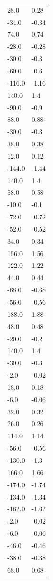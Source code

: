 \begin{longtable}{ll}
28.0 & 0.28 \\
-34.0 & -0.34 \\
74.0 & 0.74 \\
-28.0 & -0.28 \\
-30.0 & -0.3 \\
-60.0 & -0.6 \\
-116.0 & -1.16 \\
140.0 & 1.4 \\
-90.0 & -0.9 \\
88.0 & 0.88 \\
-30.0 & -0.3 \\
38.0 & 0.38 \\
12.0 & 0.12 \\
-144.0 & -1.44 \\
140.0 & 1.4 \\
58.0 & 0.58 \\
-10.0 & -0.1 \\
-72.0 & -0.72 \\
-52.0 & -0.52 \\
34.0 & 0.34 \\
156.0 & 1.56 \\
122.0 & 1.22 \\
44.0 & 0.44 \\
-68.0 & -0.68 \\
-56.0 & -0.56 \\
188.0 & 1.88 \\
48.0 & 0.48 \\
-20.0 & -0.2 \\
140.0 & 1.4 \\
-30.0 & -0.3 \\
-2.0 & -0.02 \\
18.0 & 0.18 \\
-6.0 & -0.06 \\
32.0 & 0.32 \\
26.0 & 0.26 \\
114.0 & 1.14 \\
-56.0 & -0.56 \\
-130.0 & -1.3 \\
166.0 & 1.66 \\
-174.0 & -1.74 \\
-134.0 & -1.34 \\
-162.0 & -1.62 \\
-2.0 & -0.02 \\
-6.0 & -0.06 \\
-46.0 & -0.46 \\
-38.0 & -0.38 \\
68.0 & 0.68 \\

\end{longtable}
